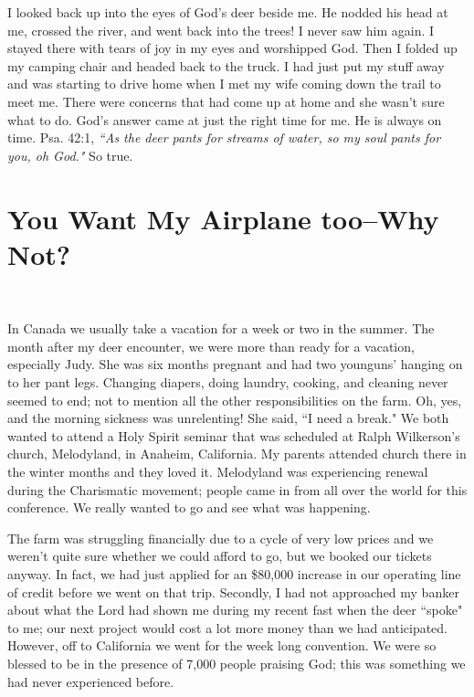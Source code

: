 \documentclass[oneside,12pt]{book}
\begin{document}
I looked back up into the eyes of God's deer beside me. He nodded his head at me, crossed the river, and went back into the trees! I never saw him again. I stayed there with tears of joy in my eyes and worshipped God. Then I folded up my camping chair and headed back to the truck. I had just put my stuff away and was starting to drive home when I met my wife coming down the trail to meet me. There were concerns that had come up at home and she wasn't sure what to do. God's answer came at just the right time for me. He is always on time. Psa. 42:1, \textit{``As the deer pants for streams of water, so my soul pants for you, oh God."} So true.


\section{You Want My Airplane too--Why Not?}
\

In Canada we usually take a  vacation for a week or two in the summer. The month after my deer encounter, we were more than ready for a vacation, especially Judy. She was six months pregnant and had two younguns' hanging on to her pant legs. Changing diapers, doing laundry, cooking, and cleaning never seemed to end; not to mention all the other responsibilities on the farm. Oh, yes, and the morning sickness was unrelenting! She said, ``I need a break." We both wanted to attend a Holy Spirit seminar that was scheduled at Ralph Wilkerson's church, Melodyland, in Anaheim, California. My parents attended church there in the winter months and they loved it. Melodyland was experiencing renewal during the Charismatic movement; people came in from all over the world for this conference. We really wanted to go and see what was happening. 

The farm was struggling financially due to a cycle of very low prices and we weren't quite sure whether we could afford to go, but we booked our tickets anyway. In fact, we had just applied for an \$80,000 increase in our operating line of credit before we went on that trip. Secondly, I had not approached my banker about what the Lord had shown me during my recent fast when the deer ``spoke" to me; our next project would cost a lot more money than we had anticipated. However, off to California we went for the week long convention. We were so blessed to be in the presence of 7,000 people praising God; this was something we had never experienced before.
\end{document}
